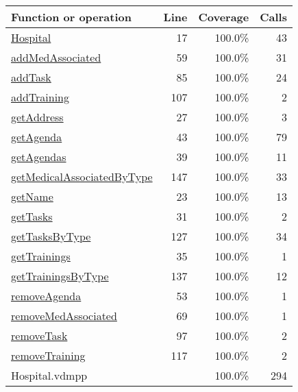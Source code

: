 \begin{longtable}{|l|r|r|r|}
\hline
Function or operation & Line & Coverage & Calls \\
\hline
\hline
\hyperref[Hospital:17]{Hospital} & 17&100.0\% & 43 \\
\hline
\hyperref[addMedAssociated:59]{addMedAssociated} & 59&100.0\% & 31 \\
\hline
\hyperref[addTask:85]{addTask} & 85&100.0\% & 24 \\
\hline
\hyperref[addTraining:107]{addTraining} & 107&100.0\% & 2 \\
\hline
\hyperref[getAddress:27]{getAddress} & 27&100.0\% & 3 \\
\hline
\hyperref[getAgenda:43]{getAgenda} & 43&100.0\% & 79 \\
\hline
\hyperref[getAgendas:39]{getAgendas} & 39&100.0\% & 11 \\
\hline
\hyperref[getMedicalAssociatedByType:147]{getMedicalAssociatedByType} & 147&100.0\% & 33 \\
\hline
\hyperref[getName:23]{getName} & 23&100.0\% & 13 \\
\hline
\hyperref[getTasks:31]{getTasks} & 31&100.0\% & 2 \\
\hline
\hyperref[getTasksByType:127]{getTasksByType} & 127&100.0\% & 34 \\
\hline
\hyperref[getTrainings:35]{getTrainings} & 35&100.0\% & 1 \\
\hline
\hyperref[getTrainingsByType:137]{getTrainingsByType} & 137&100.0\% & 12 \\
\hline
\hyperref[removeAgenda:53]{removeAgenda} & 53&100.0\% & 1 \\
\hline
\hyperref[removeMedAssociated:69]{removeMedAssociated} & 69&100.0\% & 1 \\
\hline
\hyperref[removeTask:97]{removeTask} & 97&100.0\% & 2 \\
\hline
\hyperref[removeTraining:117]{removeTraining} & 117&100.0\% & 2 \\
\hline
\hline
Hospital.vdmpp & & 100.0\% & 294 \\
\hline
\end{longtable}

